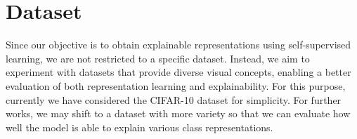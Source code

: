 \section{Dataset}
\label{sec:dataset}

Since our objective is to obtain explainable representations using self-supervised learning, we are not restricted to a specific dataset. Instead, we aim to experiment with datasets that provide diverse visual concepts, enabling a better evaluation of both representation learning and explainability. For this purpose, currently we have considered the CIFAR-10 dataset for simplicity. For further works, we may shift to a dataset with more variety so that we can evaluate how well the model is able to explain various class representations. 